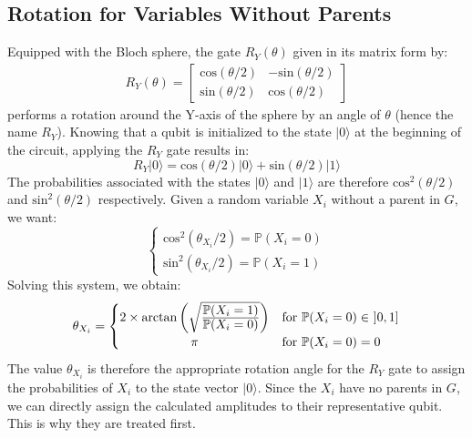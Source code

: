 \subsection{Rotation for Variables Without Parents}
\label{simple_rotation_calc}
Equipped with the Bloch sphere, the gate $R_Y(\theta)$ given in its matrix form by:
\begin{align*}
R_Y(\theta) = 
\begin{bmatrix}
\mathrm{cos}(\theta/2) & -\mathrm{sin}(\theta/2) \\
\mathrm{sin}(\theta/2) & \mathrm{cos}(\theta/2)
\end{bmatrix}
\end{align*}
performs a rotation around the Y-axis of the sphere by an angle of $\theta$ (hence the name $R_Y$). 
Knowing that a qubit is initialized to the state $|0\rangle$ at the beginning of the circuit, applying the $R_Y$ gate results in:
\[R_Y|0\rangle = \mathrm{cos}(\theta/2)|0\rangle+\mathrm{sin}(\theta/2)|1\rangle\]
The probabilities associated with the states $|0\rangle$ and $|1\rangle$ are therefore $\mathrm{cos}^2(\theta/2)$ and $\mathrm{sin}^2(\theta/2)$ respectively. Given a random variable $X_i$ without a parent in $G$, we want:
\[
\begin{cases}
\mathrm{cos}^2(\theta_{X_i}/2) = \mathbb{P}(X_i=0) \\
\mathrm{sin}^2(\theta_{X_i}/2) = \mathbb{P}(X_i=1)
\end{cases}
\]
Solving this system, we obtain:
\[
\theta_{X_i} = 
 \begin{cases}
 2\times\mathrm{arctan}\left(\sqrt{\frac{\displaystyle \mathbb{P}(X_i=1)}{\displaystyle \mathbb{P}(X_i=0)}}\right) & \mathrm{for} \ \mathbb{P}(X_i=0) \in \ ]0,1] \\
 \hfil \pi & \mathrm{for} \ \mathbb{P}(X_i=0)=0
 \end{cases}
\]
The value $\theta_{X_i}$ is therefore the appropriate rotation angle for the $R_Y$ gate to assign the probabilities of $X_i$ to the state vector $|0\rangle$. Since the $X_i$ have no parents in $G$, we can directly assign the calculated amplitudes to their representative qubit. This is why they are treated first.


